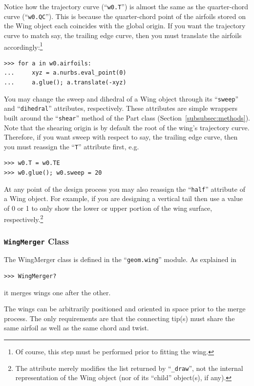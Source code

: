 \documentclass[]{article}
\begin{document}
Notice how the trajectory curve (``\texttt{w0.T}'') is almost the same 
as the quarter-chord curve (``\texttt{w0.QC}'').  This is because the 
quarter-chord point of the airfoils stored on the Wing object each 
coincides with the global origin.  If you want the trajectory curve to 
match say, the trailing edge curve, then you must translate the airfoils 
accordingly:\footnote{Of course, this step must be performed prior to 
fitting the wing.}
\begin{verbatim}
>>> for a in w0.airfoils:
...     xyz = a.nurbs.eval_point(0)
...     a.glue(); a.translate(-xyz)
\end{verbatim}

You may change the sweep and dihedral of a Wing object through its 
``\texttt{sweep}'' and ``\texttt{dihedral}'' attributes, respectively.  
These attributes are simple wrappers built around the ``\texttt{shear}'' 
method of the Part class (Section~\ref{subsubsec:methods}).  Note that 
the shearing origin is by default the root of the wing's trajectory 
curve.  Therefore, if you want sweep with respect to say, the trailing 
edge curve, then you must reassign the ``\texttt{T}'' attribute first, 
e.g.
\begin{verbatim}
>>> w0.T = w0.TE
>>> w0.glue(); w0.sweep = 20
\end{verbatim}

At any point of the design process you may also reassign the 
``\texttt{half}'' attribute of a Wing object.  For example, if you are 
designing a vertical tail then use a value of 0 or 1 to only show the 
lower or upper portion of the wing surface, respectively.\footnote{The 
attribute merely modifies the list returned by ``\texttt{\_draw}'', not 
the internal representation of the Wing object (nor of its ``child'' 
object(s), if any).}

\subsubsection{\texttt{WingMerger} Class}
\label{subsubsec:wingmerger}

The WingMerger class is defined in the ``\texttt{geom.wing}'' module.  
As explained in
\begin{verbatim}
>>> WingMerger?
\end{verbatim}
it merges wings one after the other.

The wings can be arbitrarily positioned and oriented in space prior to 
the merge process.  The only requirements are that the connecting tip(s) 
must share the same airfoil as well as the same chord and twist.
\end{document}
